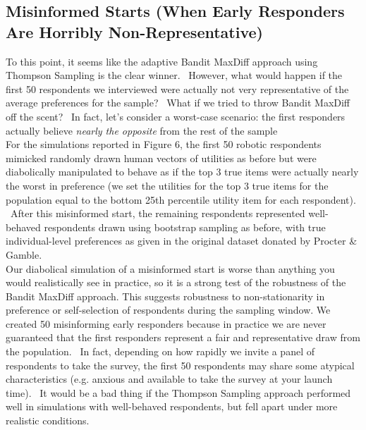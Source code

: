 \documentclass[nonblindrev]{informs3}
\begin{document}
\subsection{Misinformed Starts (When Early Responders Are Horribly Non-Representative)}
To this point, it seems like the adaptive Bandit MaxDiff approach using Thompson Sampling is the clear winner.  However, what would happen if the first 50 respondents we interviewed were actually not very representative of the average preferences for the sample?  What if we tried to throw Bandit MaxDiff off the scent?  In fact, let's consider a worst-case scenario: the first responders actually believe \textit{nearly the opposite} from the rest of the sample\\
For the simulations reported in Figure 6, the first 50 robotic respondents mimicked randomly drawn human vectors of utilities as before but were diabolically manipulated to behave as if the top 3 true items were actually nearly the worst in preference (we set the utilities for the top 3 true items for the population equal to the bottom 25th percentile utility item for each respondent).  After this misinformed start, the remaining respondents represented well-behaved respondents drawn using bootstrap sampling as before, with true individual-level preferences as given in the original dataset donated by Procter \& Gamble.\\
Our diabolical simulation of a misinformed start is worse than anything you would realistically see in practice, so it is a strong test of the robustness of the Bandit MaxDiff approach. This suggests robustness to non-stationarity in preference or self-selection of respondents during the sampling window. We created 50 misinforming early responders because in practice we are never guaranteed that the first responders represent a fair and representative draw from the population.  In fact, depending on how rapidly we invite a panel of respondents to take the survey, the first 50 respondents may share some atypical characteristics (e.g. anxious and available to take the survey at your launch time).  It would be a bad thing if the Thompson Sampling approach performed well in simulations with well-behaved respondents, but fell apart under more realistic conditions. \\
\end{document}

